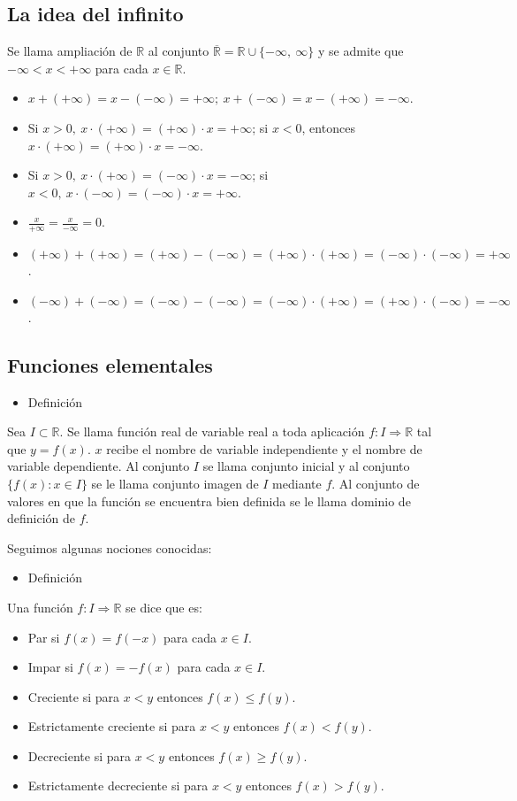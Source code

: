 \documentclass[12pt]{article}
\begin{document}
 \subsection{La idea del infinito}
 Se llama ampliación de $\mathbb{R}$ al conjunto $\overline{\mathbb{R}}=\mathbb{R}\cup\{-\infty,~\infty\}$ y se admite que $-\infty<x<+\infty$ para cada $x\in\mathbb{R}$.
 \begin{itemize}
 	\item $x+(+\infty)=x-(-\infty)=+\infty;~x+(-\infty)=x-(+\infty)=-\infty$.
 	\item Si $x>0,~x\cdot(+\infty)=(+\infty)\cdot x=+\infty$; si $x<0$, entonces $x\cdot(+\infty)=(+\infty)\cdot x=-\infty$.
 	\item Si $x>0,~x\cdot(+\infty)=(-\infty)\cdot x=-\infty$; si $x<0,~x\cdot(-\infty)=(-\infty)\cdot x=+\infty$.
 	\item $\frac{x}{+\infty}=\frac{x}{-\infty}=0$.
 	\item $(+\infty)+(+\infty)=(+\infty)-(-\infty)=(+\infty)\cdot(+\infty)=(-\infty)\cdot(-\infty)=+\infty$.
 	\item $(-\infty)+(-\infty)=(-\infty)-(-\infty)=(-\infty)\cdot(+\infty)=(+\infty)\cdot(-\infty)=-\infty$.
 \end{itemize}
\subsection{Funciones elementales}
\begin{itemize}[label=\color{red}\textbullet, leftmargin=*]
	\item \color{lightblue}Definición
\end{itemize} 
Sea $I\subset\mathbb{R}$. Se llama función real de variable real a toda aplicación $f:I\Rightarrow\mathbb{R}$ tal que $y=f(x)$. $x$ recibe el nombre de variable independiente y el nombre de variable dependiente. Al conjunto $I$ se llama conjunto inicial y al conjunto $\{f(x):x\in I\}$ se le llama conjunto imagen de $I$ mediante $f$. Al conjunto de valores en que la función se encuentra bien definida se le llama dominio de definición de $f$.

Seguimos algunas nociones conocidas:
\begin{itemize}[label=\color{red}\textbullet, leftmargin=*]
	\item \color{lightblue}Definición
\end{itemize}
Una función $f:I\Rightarrow\mathbb{R}$ se dice que es:
\begin{itemize}
	\item  Par si $f(x)=f(-x)$ para cada $x\in I$.
	\item Impar si $f(x)=-f(x)$ para cada $x\in I$.
	\item Creciente si para $x<y$ entonces $f(x)\le f(y)$.
	\item Estrictamente creciente si para $x<y$ entonces $f(x)<f(y)$.
	\item Decreciente si para $x<y$ entonces $f(x)\ge f(y)$.
	\item Estrictamente decreciente si para $x<y$ entonces $f(x)>f(y)$.
\end{itemize}
\end{document}
